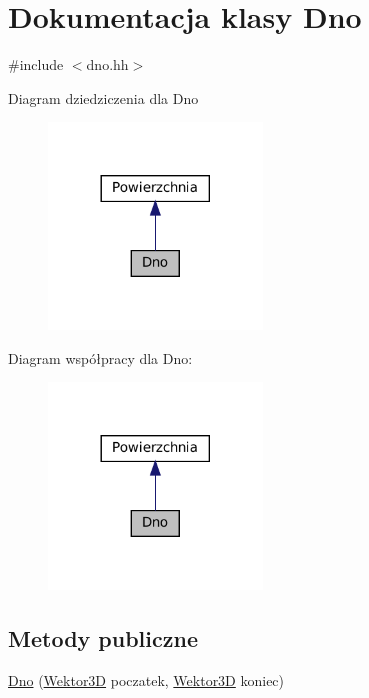 \hypertarget{class_dno}{}\section{Dokumentacja klasy Dno}
\label{class_dno}


{\ttfamily \#include $<$dno.\+hh$>$}



Diagram dziedziczenia dla Dno\nopagebreak
\begin{figure}[H]
\begin{center}
\leavevmode
\includegraphics[width=161pt]{class_dno__inherit__graph}
\end{center}
\end{figure}


Diagram współpracy dla Dno\+:\nopagebreak
\begin{figure}[H]
\begin{center}
\leavevmode
\includegraphics[width=161pt]{class_dno__coll__graph}
\end{center}
\end{figure}
\subsection*{Metody publiczne}
\begin{DoxyCompactItemize}
\item 
\mbox{\hyperlink{class_dno_ad82fb652bb1ab8381112649e4d7dc6f6}{Dno}} (\mbox{\hyperlink{class_wektor3_d}{Wektor3D}} poczatek, \mbox{\hyperlink{class_wektor3_d}{Wektor3D}} koniec)
\end{DoxyCompactItemize}
